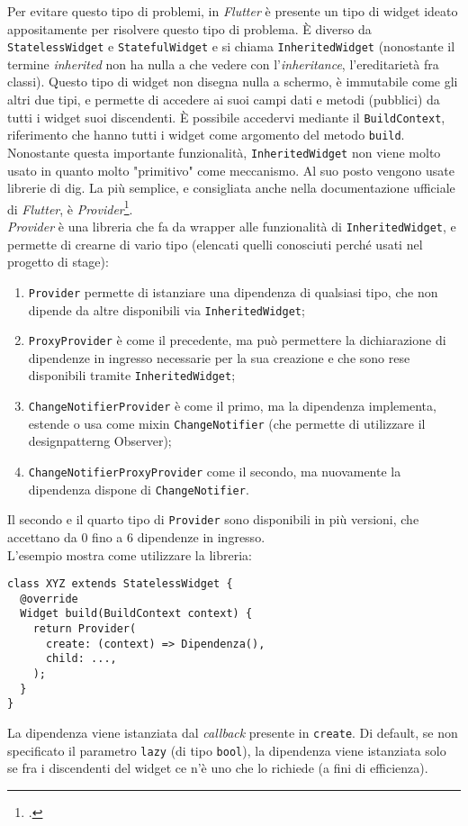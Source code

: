 Per evitare questo tipo di problemi, in \emph{Flutter} è presente un tipo di widget ideato appositamente per risolvere questo tipo di problema. È diverso da \texttt{StatelessWidget} e \texttt{StatefulWidget} e si chiama \texttt{InheritedWidget} (nonostante il termine \emph{inherited} non ha nulla a che vedere con l'\emph{inheritance}, l'ereditarietà fra classi).
Questo tipo di widget non disegna nulla a schermo, è immutabile come gli altri due tipi, e permette di accedere ai suoi campi dati e metodi (pubblici) da tutti i widget suoi discendenti.
È possibile accedervi mediante il \texttt{BuildContext}, riferimento che hanno tutti i widget come argomento del metodo \texttt{build}.\\
Nonostante questa importante funzionalità, \texttt{InheritedWidget} non viene molto usato in quanto molto "primitivo" come meccanismo. Al suo posto vengono usate librerie di \gls{dig}. La più semplice, e consigliata anche nella documentazione ufficiale di \emph{Flutter}, è \emph{Provider}\footcite{site:provider}.\\
\emph{Provider} è una libreria che fa da wrapper alle funzionalità di \texttt{InheritedWidget}, e permette di crearne di vario tipo (elencati quelli conosciuti perché usati nel progetto di stage):
\begin{enumerate}
    \item \texttt{Provider} permette di istanziare una dipendenza di qualsiasi tipo, che non dipende da altre disponibili via \texttt{InheritedWidget};
    \item \texttt{ProxyProvider} è come il precedente, ma può permettere la dichiarazione di dipendenze in ingresso necessarie per la sua creazione e che sono rese disponibili tramite \texttt{InheritedWidget};
    \item \texttt{ChangeNotifierProvider} è come il primo, ma la dipendenza implementa, estende o usa come mixin \texttt{ChangeNotifier} (che permette di utilizzare il \gls{designpatterng} Observer);
    \item \texttt{ChangeNotifierProxyProvider} come il secondo, ma nuovamente la dipendenza dispone di \texttt{ChangeNotifier}.
\end{enumerate}
Il secondo e il quarto tipo di \texttt{Provider} sono disponibili in più versioni, che accettano da 0 fino a 6 dipendenze in ingresso.\\
L'esempio mostra come utilizzare la libreria:
\begin{lstlisting}
class XYZ extends StatelessWidget {
  @override
  Widget build(BuildContext context) {
    return Provider(
      create: (context) => Dipendenza(),
      child: ...,
    );
  }
}
\end{lstlisting}
La dipendenza viene istanziata dal \emph{callback} presente in \texttt{create}. Di default, se non specificato il parametro \texttt{lazy} (di tipo \texttt{bool}), la dipendenza viene istanziata solo se fra i discendenti del widget ce n'è uno che lo richiede (a fini di efficienza).


